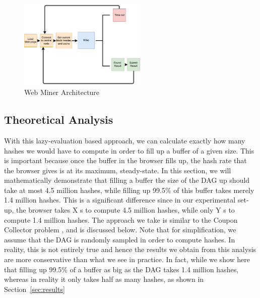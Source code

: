 \documentclass[runningheads]{llncs}
\begin{document}
\begin{figure}[h]
\centering
\includegraphics[width=230px,keepaspectratio]{Hybrid-Miner.pdf}
\caption{\label{fig:hybridArchitecture} Web Miner Architecture}
\end{figure}

\subsection{Theoretical Analysis}
With this lazy-evaluation based approach, we can calculate exactly how many hashes we would have to compute in order to fill up a buffer of a given size. This is important because once the buffer in the browser fills up, the hash rate that the browser gives is at its maximum, steady-state. In this section, we will mathematically demonstrate that filling a buffer the size of the DAG up should take at most 4.5 million hashes, while filling up 99.5\% of this buffer takes merely 1.4 million hashes. This is a significant difference since in our experimental set-up, the browser takes X s to compute 4.5 million hashes, while only Y s to compute 1.4 million hashes. The approach we take is similar to the Coupon Collector problem \cite{couponCollector}, and is discussed below. Note that for simplification, we assume that the DAG is randomly sampled in order to compute hashes. In reality, this is not entirely true and hence the results we obtain from this analysis are more conservative than what we see in practice. In fact, while we show here that filling up 99.5\% of a buffer as big as the DAG takes 1.4 million hashes, whereas in reality it only takes half as many hashes, as shown in Section~\ref{sec:results} \\
\end{document}
